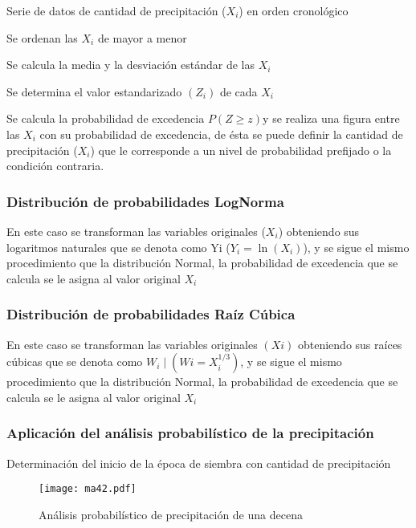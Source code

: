 Serie de datos de cantidad de precipitación ($X_i$) en orden cronológico

Se ordenan las $X_i$ de mayor a menor

Se calcula la media y la desviación estándar de las $X_i$

Se determina el valor estandarizado $(Z_i)$ de cada $X_i$

Se calcula la probabilidad de excedencia $P(Z\geq z)$y se realiza una figura entre las $X_i$ con su probabilidad de excedencia, de ésta se puede definir la cantidad de precipitación ($X_i$) que le corresponde a un nivel de probabilidad prefijado o la condición contraria.

\subsubsection{Distribución de probabilidades LogNorma}
En este caso se transforman las variables originales ($X_i$) obteniendo sus logaritmos naturales que se denota como Yi ($Y_i=\ln{\left(X_i\right)}$), y se sigue el mismo procedimiento que la distribución Normal, la probabilidad de excedencia que se calcula se le asigna al valor original $X_i$
\subsubsection{Distribución de probabilidades Raíz Cúbica}
En este caso se transforman las variables originales $(Xi)$ obteniendo sus raíces cúbicas que se denota como $W_i\mid (Wi=X_i^{1/3})$, y se sigue el mismo procedimiento que la distribución Normal, la probabilidad de excedencia que se calcula se le asigna al valor original $X_i$

\subsubsection{Aplicación del análisis probabilístico de la precipitación}
Determinación del inicio de la época de siembra con cantidad de precipitación
\begin{figure}[h!]
    \centering
      \texttt{[image: ma42.pdf]}
      \caption{Análisis probabilístico de precipitación de una decena}
      \label{ma42}
    \end{figure} 
